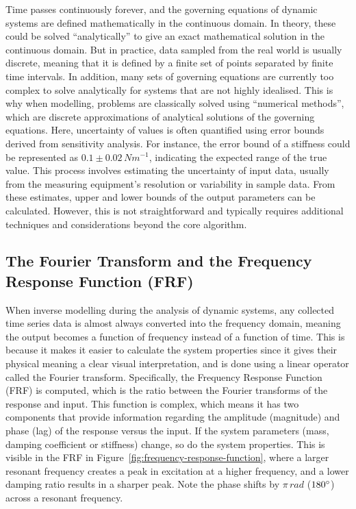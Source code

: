 \documentclass[12pt]{article}
\begin{document}
    Time passes continuously forever, and the governing equations of dynamic systems are defined mathematically in the continuous domain.
    In theory, these could be solved ``analytically'' to give an exact mathematical solution in the continuous domain.
    But in practice, data sampled from the real world is usually discrete, meaning that it is defined by a finite set of points separated by finite time intervals.
    In addition, many sets of governing equations are currently too complex to solve analytically for systems that are not highly idealised.
    This is why when modelling, problems are classically solved using ``numerical methods'', which are discrete approximations of analytical solutions of the governing equations.
    Here, uncertainty of values is often quantified using error bounds derived from sensitivity analysis.
    For instance, the error bound of a stiffness could be represented as $0.1 \pm 0.02 \, Nm^{-1}$, indicating the expected range of the true value.
    This process involves estimating the uncertainty of input data, usually from the measuring equipment's resolution or variability in sample data.
    From these estimates, upper and lower bounds of the output parameters can be calculated.
    However, this is not straightforward and typically requires additional techniques and considerations beyond the core algorithm.


    \subsection{The Fourier Transform and the Frequency Response Function (FRF)}

    When inverse modelling during the analysis of dynamic systems, any collected time series data is almost always converted into the frequency domain, meaning the output becomes a function of frequency instead of a function of time.
    This is because it makes it easier to calculate the system properties since it gives their physical meaning a clear visual interpretation, and is done using a linear operator called the Fourier transform.
    Specifically, the Frequency Response Function (FRF) is computed, which is the ratio between the Fourier transforms of the response and input.
    This function is complex, which means it has two components that provide information regarding the amplitude (magnitude) and phase (lag) of the response versus the input.
    If the system parameters (mass, damping coefficient or stiffness) change, so do the system properties.
    This is visible in the FRF in Figure~\ref{fig:frequency-response-function}, where a larger resonant frequency creates a peak in excitation at a higher frequency, and a lower damping ratio results in a sharper peak.
    Note the phase shifts by $\pi \, rad$ ($180\degree$) across a resonant frequency.
\end{document}
